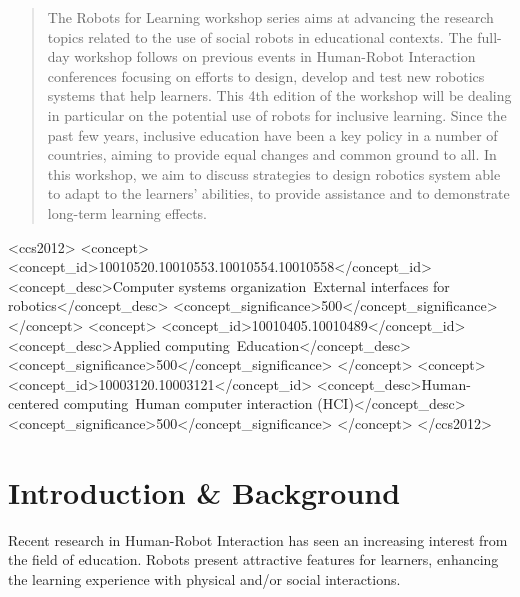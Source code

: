 \documentclass{sig-alternate-05-2015}
\begin{document}
\maketitle
\begin{abstract}
The Robots for Learning workshop series aims at advancing the research topics related to the use of social robots in educational contexts. 
The full-day workshop follows on previous events in Human-Robot Interaction conferences focusing on efforts to design, develop and test new robotics systems that help learners. 
This 4th edition of the workshop will be dealing in particular on the potential use of robots for inclusive learning.
Since the past few years, inclusive education have been a key policy in a number of countries, aiming to provide equal changes and common ground to all. 
In this workshop, we aim to discuss strategies to design robotics system able to adapt to the learners' abilities, to provide assistance and to demonstrate long-term learning effects. 

\end{abstract}

\begin{CCSXML} 
  <ccs2012> 
  <concept> 
  <concept_id>10010520.10010553.10010554.10010558</concept_id> 
  <concept_desc>Computer systems organization~External interfaces for robotics</concept_desc> 
  <concept_significance>500</concept_significance> 
  </concept> 
  <concept> 
  <concept_id>10010405.10010489</concept_id> 
  <concept_desc>Applied computing~Education</concept_desc> 
  <concept_significance>500</concept_significance> 
  </concept> 
  <concept> 
  <concept_id>10003120.10003121</concept_id> 
  <concept_desc>Human-centered computing~Human computer interaction (HCI)</concept_desc> 
  <concept_significance>500</concept_significance> 
  </concept> 
  </ccs2012> 
\end{CCSXML} 

%
%
\printccsdesc


\section{Introduction \& Background}
Recent research in Human-Robot Interaction has seen an increasing interest from the field of education.
Robots present attractive features for learners, enhancing the learning experience with physical and/or social interactions.
\end{document}
